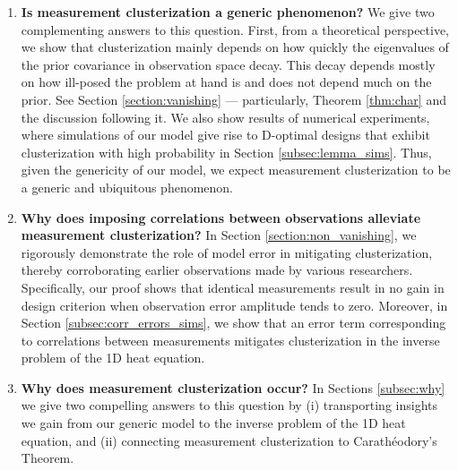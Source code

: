 \begin{enumerate}
\item \label{q:generic} \textbf{Is measurement clusterization a
  generic phenomenon?}
  We give two complementing answers to this question. First, from a
  theoretical perspective, we show that clusterization mainly depends
  on how quickly the eigenvalues of the prior covariance in
  observation space decay. This decay depends mostly on how ill-posed
  the problem at hand is and does not depend much on the prior. See
  Section \ref{section:vanishing} --- particularly, Theorem
  \ref{thm:char} and the discussion following it. We also show results
  of numerical experiments, where simulations of our model give rise
  to D-optimal designs that exhibit clusterization with high
  probability in Section \ref{subsec:lemma_sims}. Thus, given the
  genericity of our model, we expect measurement clusterization to be
  a generic and ubiquitous phenomenon.

\item \label{q:mitigate} \textbf{Why does imposing correlations
  between observations alleviate measurement clusterization?} In
  Section \ref{section:non_vanishing}, we rigorously demonstrate the
  role of model error in mitigating clusterization, thereby
  corroborating earlier observations made by various
  researchers. Specifically, our proof shows that identical
  measurements result in no gain in design criterion when observation
  error amplitude tends to zero. Moreover, in Section
  \ref{subsec:corr_errors_sims}, we show that an error term
  corresponding to correlations between measurements mitigates
  clusterization in the inverse problem of the 1D heat equation.

\item \label{q:why} \textbf{Why does measurement clusterization
  occur?} In Sections \ref{subsec:why} we give two compelling answers
  to this question by (i) transporting insights we gain from our
  generic model to the inverse problem of the 1D heat equation, and
  (ii) connecting measurement clusterization to Carath\'eodory's
  Theorem.


\end{enumerate}
